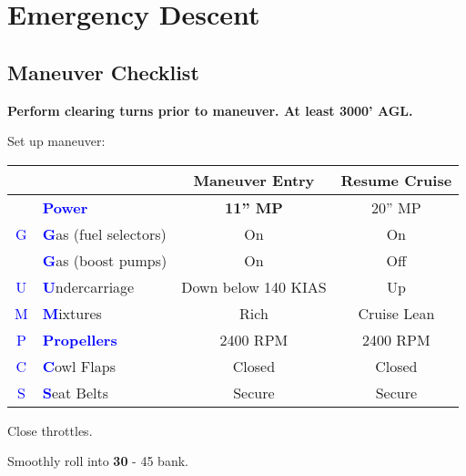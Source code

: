 \newpage

\section{Emergency Descent}
\subsection{Maneuver Checklist}

\textbf{Perform clearing turns prior to maneuver. At least 3000' AGL.}

Set up maneuver:

\begin{table}[H]
\centering
\begin{tabular}{|c|l|c|c|}
\hline
                    &                                                 & \textbf{Maneuver Entry} & \textbf{Resume Cruise} \\ \hline
                    & \textcolor{blue}{\textbf{Power}}                & \textbf{11'' MP}        & 20'' MP                \\ \hline
\textcolor{blue}{G} & \textcolor{blue}{\textbf{G}}as (fuel selectors) & On                      & On                     \\
                    & \textcolor{blue}{\textbf{G}}as (boost pumps)    & On                      & Off                    \\ \hline
\textcolor{blue}{U} & \textcolor{blue}{\textbf{U}}ndercarriage        & Down below 140 KIAS     & Up                     \\ \hline
\textcolor{blue}{M} & \textcolor{blue}{\textbf{M}}ixtures             & Rich                    & Cruise Lean            \\ \hline
\textcolor{blue}{P} & \textcolor{blue}{\textbf{Propellers}}           & 2400 RPM                & 2400 RPM               \\ \hline
\textcolor{blue}{C} & \textcolor{blue}{\textbf{C}}owl Flaps           & Closed                  & Closed                 \\ \hline
\textcolor{blue}{S} & \textcolor{blue}{\textbf{S}}eat Belts           & Secure                  & Secure                 \\ \hline
\end{tabular}
\end{table}

Close throttles.

Smoothly roll into \textbf{30\degree{}} - 45\degree{} bank.

